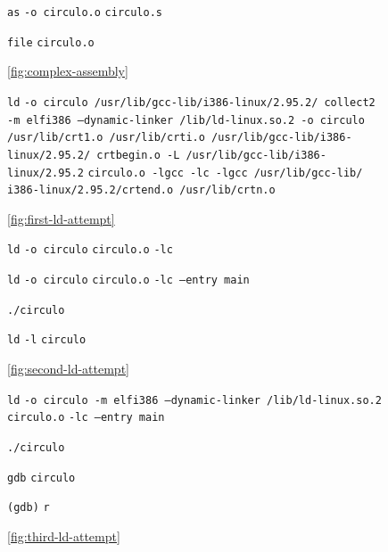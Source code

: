 \documentclass[11pt]{article}
\newcommand{\codetext}[2]{\large\texttt{\textcolor{#1}{#2}}}
\newcommand{\imagecaption}[1]{\vspace{-7pt}\caption*{\char91\ref{fig:#1}\char93}}
\begin{document}
		\begin{figure}[H]
			\centering
			\begin{code-box}
				\codetext{light-blue}{as} \codetext{orange-desert-vim}{-o circulo.o} \codetext{light-red}{circulo.s}
				
				\codetext{light-blue}{file} \codetext{light-red}{circulo.o}
			\end{code-box}
			\imagecaption{complex-assembly}
		\end{figure}
		
		\begin{figure}[H]
			\centering
			\begin{code-box}
			\codetext{light-blue}{ld} \codetext{orange-desert-vim}{-o circulo /usr/lib/gcc-lib/i386-linux/2.95.2/ collect2 -m elf\textunderscore{}i386 --dynamic-linker /lib/ld-linux.so.2 -o circulo /usr/lib/crt1.o /usr/lib/crti.o /usr/lib/gcc-lib/i386-linux/2.95.2/ crtbegin.o -L /usr/lib/gcc-lib/i386-linux/2.95.2} \codetext{light-red}{circulo.o }\codetext{orange-desert-vim}{-lgcc -lc -lgcc /usr/lib/gcc-lib/ i386-linux/2.95.2/crtend.o /usr/lib/crtn.o}
			\end{code-box}
			\imagecaption{first-ld-attempt}
		\end{figure}
		
		\begin{figure}[H]
			\centering
			\begin{code-box}
				\codetext{light-blue}{ld} \codetext{orange-desert-vim}{-o circulo} \codetext{light-red}{circulo.o} \codetext{orange-desert-vim}{-lc}
				
				\codetext{light-blue}{ld} \codetext{orange-desert-vim}{-o circulo} \codetext{light-red}{circulo.o} \codetext{orange-desert-vim}{-lc --entry main}
				
				\codetext{light-blue}{./circulo}
				
				\codetext{light-blue}{ld} \codetext{orange-desert-vim}{-l} \codetext{light-red}{circulo}
			\end{code-box}
			\imagecaption{second-ld-attempt}
		\end{figure}
		
		\begin{figure}[H]
			\centering
			\begin{code-box}
				\codetext{light-blue}{ld} \codetext{orange-desert-vim}{-o circulo -m elf\textunderscore\/i386 --dynamic-linker /lib/ld-linux.so.2} \codetext{light-red}{circulo.o} \codetext{orange-desert-vim}{-lc --entry main}
				
				\codetext{light-blue}{./circulo}
				
				\codetext{light-blue}{gdb} \codetext{light-red}{circulo}
				
				\codetext{light-green}{(gdb)} \codetext{light-blue}{r}
			\end{code-box}
			\imagecaption{third-ld-attempt}
		\end{figure}
		
\end{document}
